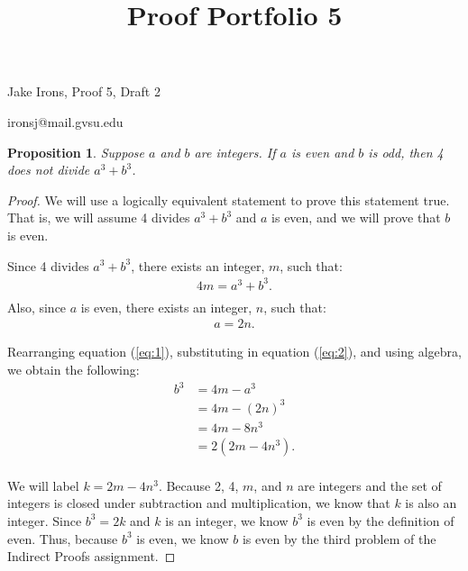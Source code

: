 \documentclass[11 pt]{article}
\title{Proof Portfolio 5}
\newtheorem{proposition}{Proposition}
\newcommand{\newpar}{\vspace{.15in}\noindent}
\begin{document}
\noindent Jake Irons, Proof 5, Draft 2

\noindent ironsj@mail.gvsu.edu

\newpar
\begin{proposition}
Suppose $a$ and $b$ are integers. If $a$ is even and $b$ is odd, then 4 does not divide $a^3+b^3$.
\end{proposition}
\begin{proof}
We will use a logically equivalent statement to prove this statement true. That is, we will assume 4 divides $a^3+b^3$ and $a$ is even, and we will prove that $b$ is even.

\newpar
Since 4 divides $a^3+b^3$, there exists an integer, $m$, such that:
\begin{align}
4m=a^3+b^3. \label{eq:1} \\
\nonumber \end{align}
\noindent Also, since $a$ is even, there exists an integer, $n$, such that:
\begin{align}
a=2n. \label{eq:2}
\end{align}

\newpar
Rearranging equation (\ref{eq:1}), substituting in equation (\ref{eq:2}), and using algebra, we obtain the following:
\begin{align*}
b^3&=4m-a^3 \\
&=4m-(2n)^3 \\
&=4m-8n^3 \\
&=2(2m-4n^3). \\
\end{align*}

\newpar We will label $k=2m-4n^3$. Because 2, 4, $m$, and $n$ are integers and the set of integers is closed under subtraction and multiplication, we know that $k$ is also an integer. Since $b^3=2k$ and $k$ is an integer, we know $b^3$ is even by the definition of even. Thus, because $b^3$ is even, we know $b$ is even by the third problem of the Indirect Proofs assignment.
\end{proof}
\end{document}
